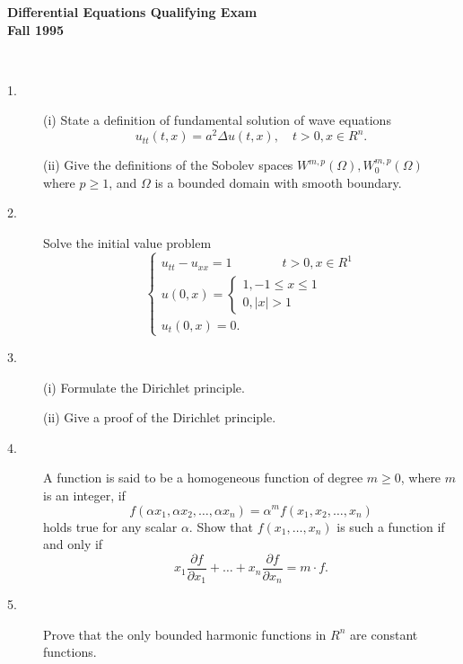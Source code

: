 \documentclass{article}
\begin{document}






\begin{center}\begin{LARGE}
{\bf Differential Equations Qualifying Exam}\\ 
{\bf Fall 1995}\\ \end{LARGE}
\end{center}
\vspace{0.1in}
\noindent\hrulefill\\
\begin{description}

\item[1.] (i)
State a definition of fundamental solution of wave equations
$$u_{tt} (t,x) = a^2 \Delta u(t,x), \quad t > 0, x \in R^n.$$

\item[\quad] (ii)
Give the definitions of the Sobolev spaces
$W^{m,p} (\Omega), W_0^{m,p} (\Omega)$ where $p \geq 1$, and $\Omega$ is a
bounded domain with smooth boundary.

\item[2.]
Solve the initial value problem
$$\begin{cases}
        u_{tt} - u_{xx} = 1 \qquad \qquad t >0 , x \in R^1 \\
        u(0,x) = \begin{cases} 1, -1 \leq x \leq 1 \\ 0, |x|>1 \end{cases}\\
        u_t(0,x) = 0.
        \end{cases}$$

\item[3.] (i)
Formulate the Dirichlet principle.

\item[\quad] (ii)
Give a proof of the Dirichlet principle.

\item[4.]
A function is said to be a homogeneous function of degree $m\geq 0$, where
$m$ is an integer, if
$$f(\alpha x_1, \alpha x_2, \dots, \alpha x_n) = \alpha^m f(x_1, x_2, \dots,
   x_n)$$
holds true for any scalar $\alpha$. Show that $f(x_1, \dots, x_n)$ is
such a function if and only if
$$x_1 \frac{\partial f}{\partial x_1} + \dots + x_n
  \frac{\partial f}{\partial x_n} = m \cdot f.$$

\item[5.]
Prove that the only bounded harmonic functions in $R^n$ are constant functions.


\end{description}
\end{document}
